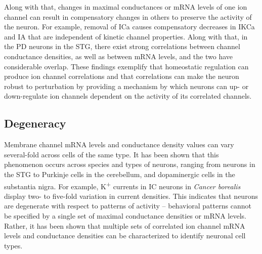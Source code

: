 Along with that, changes in maximal conductances or mRNA levels of one ion channel can result in compensatory changes in others to preserve the activity of the neuron. For example, removal of \acs{ICa} causes compensatory decreases in \acs{IKCa} and \acs{IA} that are independent of kinetic channel properties\cite{peng_drosophila_2007}. 
Along with that, in the \ac{PD} neurons in the \ac{STG}, there exist strong correlations between channel conductance densities, as well as between mRNA levels, and the two have considerable overlap\cite{temporal_neuromodulation_2011}. %
These findings exemplify that homeostatic regulation can produce ion channel correlations and that correlations can make the neuron robust to perturbation by providing a mechanism by which neurons can up- or down-regulate ion channels dependent on the activity of its correlated channels.

\subsection{Degeneracy}
Membrane channel mRNA levels and conductance density values can vary several-fold across cells of the same type\cite{schulz_variable_2006,liu_model_1998,golowasch_activity-dependent_1999,swensen_robustness_2005,prinz_similar_2004}.
It has been shown that this phenomenon occurs across species and types of neurons, ranging from neurons in the \ac{STG} to Purkinje cells in the cerebellum, and dopaminergic cells in the substantia nigra\cite{schulz_variable_2006,swensen_robustness_2005,liss_tuning_2001}.
For example, K\textsuperscript{+} currents in \ac{IC} neurons in \textit{Cancer borealis} display two- to five-fold variation in current densities\cite{golowasch_activity-dependent_1999}.
This indicates that neurons are degenerate with respect to patterns of activity -- behavioral patterns cannot be specified by a single set of maximal conductance densities or mRNA levels.
Rather, it has been shown that multiple sets of correlated ion channel mRNA levels and conductance densities can be characterized to identify neuronal cell types\cite{schulz_quantitative_2007,oleary_correlations_2013,oleary_cell_2014}.

